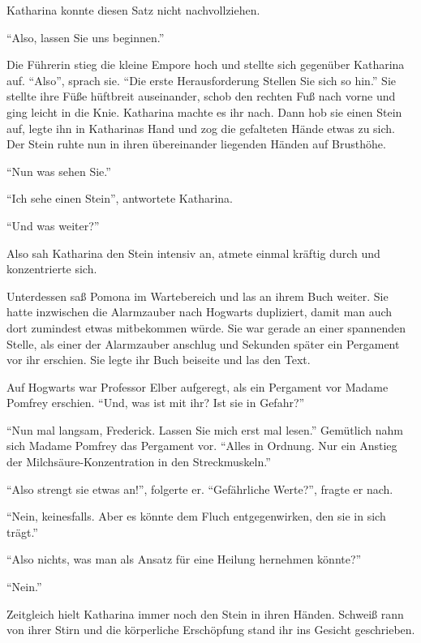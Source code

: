 Katharina konnte diesen Satz nicht nachvollziehen. 

\enquote{Also, lassen Sie uns beginnen.} %

Die Führerin stieg die kleine Empore hoch und stellte sich gegenüber Katharina auf. \enquote{Also}, sprach sie. \enquote{Die erste Herausforderung \gst Stellen Sie sich so hin.} Sie stellte ihre Füße hüftbreit auseinander, schob den rechten Fuß nach vorne und ging leicht in die Knie. Katharina machte es ihr nach. Dann hob sie einen Stein auf, legte ihn in Katharinas Hand und zog die gefalteten Hände etwas zu sich. Der Stein ruhte nun in ihren übereinander liegenden Händen auf Brusthöhe.

\enquote{Nun \gst was sehen Sie.}

\enquote{Ich sehe \gst einen Stein}, antwortete Katharina.

\enquote{Und was weiter?}

Also sah Katharina den Stein intensiv an, atmete einmal kräftig durch und konzentrierte sich.

Unterdessen saß Pomona im Wartebereich und las an ihrem Buch weiter. Sie hatte inzwischen die Alarmzauber nach Hogwarts dupliziert, damit man auch dort zumindest etwas mitbekommen würde. Sie war gerade an einer spannenden Stelle, als einer der Alarmzauber anschlug und Sekunden später ein Pergament vor ihr erschien. Sie legte ihr Buch beiseite und las den Text.

Auf Hogwarts war Professor Elber aufgeregt, als ein Pergament vor Madame Pomfrey erschien. \enquote{Und, was ist mit ihr? Ist sie in Gefahr?}

\enquote{Nun mal langsam, Frederick. Lassen Sie mich erst mal lesen.} Gemütlich nahm sich Madame Pomfrey das Pergament vor. \enquote{Alles in Ordnung. Nur ein Anstieg der Milchsäure-Konzentration in den Streckmuskeln.}

\enquote{Also strengt sie etwas an!}, folgerte er. \enquote{Gefährliche Werte?}, fragte er nach.

\enquote{Nein, keinesfalls. Aber es könnte dem Fluch entgegenwirken, den sie in sich trägt.}

\enquote{Also nichts, was man als Ansatz für eine Heilung hernehmen könnte?}

\enquote{Nein.}

Zeitgleich hielt Katharina immer noch den Stein in ihren Händen. Schweiß rann von ihrer Stirn und die körperliche Erschöpfung stand ihr ins Gesicht geschrieben.

